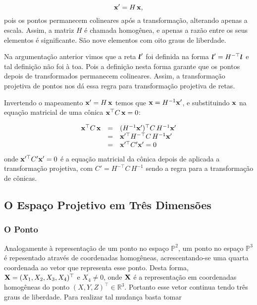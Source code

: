 \begin{equation*}
\mathbf{x}'=H\,\mathbf{x},
\end{equation*}
pois os pontos permanecem colineares após a transformação, alterando apenas a escala. Assim, a matriz $H$ é chamada homogênea, e apenas a razão entre os seus elementos é significante. São nove elementos com oito graus de liberdade.\\


Na argumentação anterior vimos que a reta $\boldsymbol{l}'$ foi definida na forma $\boldsymbol{l}'=H^{-\top}\boldsymbol{l}$ e tal definição não foi à toa. Pois a definição nesta forma garante que os pontos depois de transformados permanecem colineares. Assim, a transformação projetiva de pontos nos dá essa regra para transformação projetiva de retas.\\


Invertendo o mapeamento $\mathbf{x}'=H\,\mathbf{x}$ temos que $\mathbf{x}=H^{-1}\mathbf{x}'$, e substituindo $\mathbf{x}$ na equação matricial de uma cônica $\mathbf{x}^\top C\,\mathbf{x}=0$:

\begin{equation*}
\begin{array}{rcl}
\mathbf{x}^\top C\,\mathbf{x}&=&(H^{-1}\mathbf{x}')^\top C\,H^{-1}\mathbf{x}'\\
&=&\mathbf{x}'^\top H^{-\top}C\,H^{-1}\mathbf{x}'\\
&=&\mathbf{x}'^\top C'\mathbf{x}'=0
\end{array}
\end{equation*}
onde $\mathbf{x}'^\top C'\mathbf{x}'=0$ é a equação matricial da cônica depois de aplicada a transformação projetiva, com $C'=H^{-\top}C\,H^{-1}$ sendo a regra para a transformação de cônicas.


\subsection{O Espaço Projetivo em Três Dimensões}\label{sec.espaco-P3}


\subsubsection{O Ponto} 


Analogamente à representação de um ponto no espaço $\mathbb{P}^2$, um ponto no espaço $\mathbb{P}^3$ é repesentado através de coordenadas homogêneas, acrescentando-se uma quarta coordenada ao vetor que representa esse ponto. Desta forma, $\mathbf{X} = (X_1,X_2,X_3,X_4)^\top$ e $X_4 \ne 0$, onde $\mathbf{X}$ é a representação em coordenadas homogêneas do ponto $(X,Y,Z)^\top \in \mathbb{R}^3$. Portanto esse vetor continua tendo três graus de liberdade. Para realizar tal mudança basta tomar 

